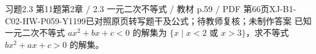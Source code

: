 \par\noindent\begin{minipage}{\linewidth}
\begin{bankitem}{习题2.3 第11题}{第2章 / 2.3 一元二次不等式 / 教材 p.59 / PDF 第66页}{XJ-B1-C02-HW-P059-Y1199}{已对照原页转写题干及公式；待教师复核；未制作答案}
已知一元二次不等式 $ax^2+bx+c<0$ 的解集为 $\{x\mid x<2\text{ 或 }x>3\}$，求不等式 $bx^2+ax+c>0$ 的解集。
\end{bankitem}
\end{minipage}\par\medskip

